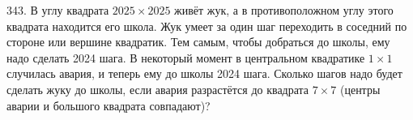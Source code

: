 343. В углу квадрата $2025\times2025$ живёт жук, а в противоположном углу этого квадрата находится его школа. Жук умеет за один шаг переходить в соседний по стороне или вершине квадратик. Тем самым, чтобы добраться до школы, ему надо сделать 2024 шага. В некоторый момент в центральном квадратике $1\times1$ случилась авария, и теперь ему до школы 2024 шага. Сколько шагов надо будет сделать жуку до школы, если авария разрастётся до квадрата $7\times7$ (центры аварии и большого квадрата совпадают)?\\
